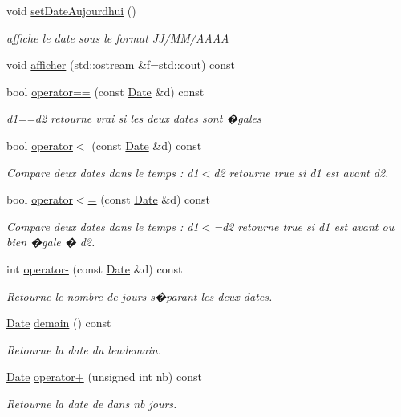 \begin{DoxyCompactItemize}
void \hyperlink{class_t_i_m_e_1_1_date_ace4be52a503c45de93b8db92dc592d93}{set\+Date\+Aujourdhui} ()
\begin{DoxyCompactList}\small\item\em affiche le date sous le format J\+J/\+M\+M/\+A\+A\+A\+A \end{DoxyCompactList}\item 
void \hyperlink{class_t_i_m_e_1_1_date_aa45188755f5d9d17cbebf0e55d3c571b}{afficher} (std\+::ostream \&f=std\+::cout) const 
\item 
bool \hyperlink{class_t_i_m_e_1_1_date_aa8208298c0efe5dbf661c66a284fd163}{operator==} (const \hyperlink{class_t_i_m_e_1_1_date}{Date} \&d) const 
\begin{DoxyCompactList}\small\item\em d1==d2 retourne vrai si les deux dates sont �gales \end{DoxyCompactList}\item 
bool \hyperlink{class_t_i_m_e_1_1_date_a8a3bccb05f00086e64c5b5518a37949f}{operator$<$} (const \hyperlink{class_t_i_m_e_1_1_date}{Date} \&d) const 
\begin{DoxyCompactList}\small\item\em Compare deux dates dans le temps \+: d1$<$d2 retourne true si d1 est avant d2. \end{DoxyCompactList}\item 
bool \hyperlink{class_t_i_m_e_1_1_date_a4e6d6c380ef57bd34506ba8f017fec67}{operator$<$=} (const \hyperlink{class_t_i_m_e_1_1_date}{Date} \&d) const 
\begin{DoxyCompactList}\small\item\em Compare deux dates dans le temps \+: d1$<$=d2 retourne true si d1 est avant ou bien �gale � d2. \end{DoxyCompactList}\item 
int \hyperlink{class_t_i_m_e_1_1_date_a61f93f8612a998bc440070f9b8a2660a}{operator-\/} (const \hyperlink{class_t_i_m_e_1_1_date}{Date} \&d) const 
\begin{DoxyCompactList}\small\item\em Retourne le nombre de jours s�parant les deux dates. \end{DoxyCompactList}\item 
\hyperlink{class_t_i_m_e_1_1_date}{Date} \hyperlink{class_t_i_m_e_1_1_date_a85907da4cadaff930c748328fda4d527}{demain} () const 
\begin{DoxyCompactList}\small\item\em Retourne la date du lendemain. \end{DoxyCompactList}\item 
\hyperlink{class_t_i_m_e_1_1_date}{Date} \hyperlink{class_t_i_m_e_1_1_date_a3c1f346c2ad9287155a71dc5d09e7fd8}{operator+} (unsigned int nb) const 
\begin{DoxyCompactList}\small\item\em Retourne la date de dans nb jours. \end{DoxyCompactList}\end{DoxyCompactItemize}
